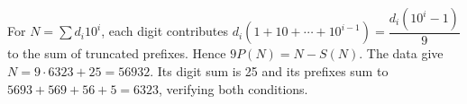 For $N=\sum d_i10^i$, each digit contributes $d_i(1+10+\cdots+10^{i-1})=\dfrac{d_i(10^i-1)}{9}$ to the sum of truncated prefixes. Hence $9P(N)=N-S(N)$. The data give $N=9\cdot6323+25=\boxed{56932}$. Its digit sum is 25 and its prefixes sum to $5693+569+56+5=6323$, verifying both conditions.
